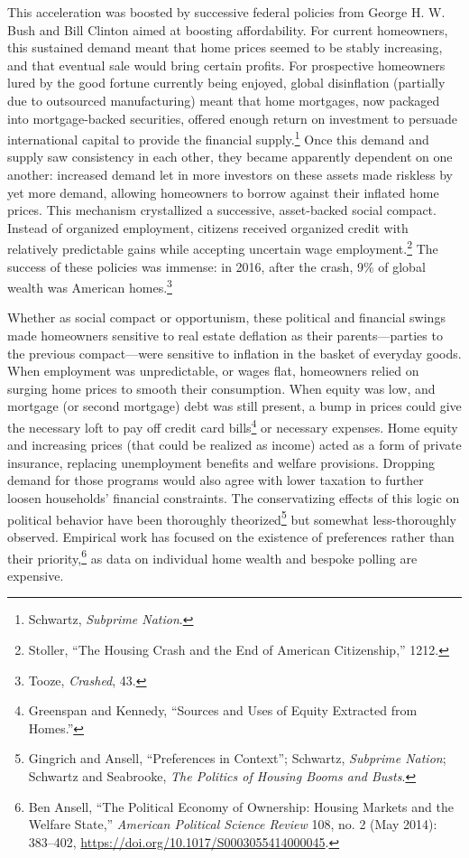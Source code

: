 \documentclass[12pt,oneside]{psthesis}
\begin{document}
This acceleration was boosted by successive federal policies from George H. W. Bush and Bill Clinton aimed at boosting affordability.
For current homeowners, this sustained demand meant that home prices seemed to be stably increasing, and that eventual sale would bring certain profits.
For prospective homeowners lured by the good fortune currently being enjoyed, global disinflation (partially due to outsourced manufacturing) meant that home mortgages, now packaged into mortgage-backed securities, offered enough return on investment to persuade international capital to provide the financial supply.\footnote{Schwartz, \emph{Subprime Nation}.}
Once this demand and supply saw consistency in each other, they became apparently dependent on one another: increased demand let in more investors on these assets made riskless by yet more demand, allowing homeowners to borrow against their inflated home prices.
This mechanism crystallized a successive, asset-backed social compact.
Instead of organized employment, citizens received organized credit with relatively predictable gains while accepting uncertain wage employment.\footnote{Stoller, ``The Housing Crash and the End of American Citizenship,'' 1212.}
The success of these policies was immense: in 2016, after the crash, 9\% of global wealth was American homes.\footnote{Tooze, \emph{Crashed}, 43.}

Whether as social compact or opportunism, these political and financial swings made homeowners sensitive to real estate deflation as their parents---parties to the previous compact---were sensitive to inflation in the basket of everyday goods.
When employment was unpredictable, or wages flat, homeowners relied on surging home prices to smooth their consumption.
When equity was low, and mortgage (or second mortgage) debt was still present, a bump in prices could give the necessary loft to pay off credit card bills\footnote{Greenspan and Kennedy, ``Sources and Uses of Equity Extracted from Homes.''} or necessary expenses.
Home equity and increasing prices (that could be realized as income) acted as a form of private insurance, replacing unemployment benefits and welfare provisions.
Dropping demand for those programs would also agree with lower taxation to further loosen households' financial constraints.
The conservatizing effects of this logic on political behavior have been thoroughly theorized\footnote{Gingrich and Ansell, ``Preferences in Context''; Schwartz, \emph{Subprime Nation}; Schwartz and Seabrooke, \emph{The Politics of Housing Booms and Busts}.} but somewhat less-thoroughly observed.
Empirical work has focused on the existence of preferences rather than their priority,\footnote{Ben Ansell, ``The Political Economy of Ownership: Housing Markets and the Welfare State,'' \emph{American Political Science Review} 108, no. 2 (May 2014): 383--402, \url{https://doi.org/10.1017/S0003055414000045}.} as data on individual home wealth and bespoke polling are expensive.
\end{document}
